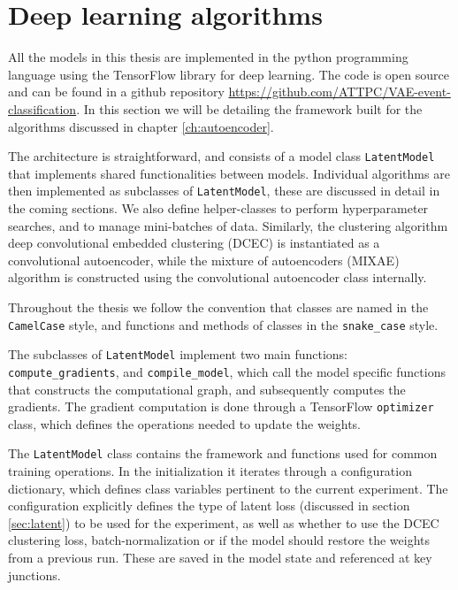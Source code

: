 \section{Deep learning algorithms}

All the models in this thesis are implemented in the python programming language using the TensorFlow library for deep learning. The code is open source and can be found in a github repository \url{https://github.com/ATTPC/VAE-event-classification}. In this section we will be detailing the framework built for the algorithms discussed in chapter \ref{ch:autoencoder}.

The architecture is straightforward, and consists of a model class \lstinline{LatentModel} that implements shared functionalities between models. Individual algorithms are then implemented as subclasses of \lstinline{LatentModel}, these are discussed in detail in the coming sections. We also define helper-classes to perform hyperparameter searches, and to manage mini-batches of data. Similarly, the clustering algorithm deep convolutional embedded clustering (DCEC) is instantiated as a convolutional autoencoder, while the mixture of autoencoders (MIXAE) algorithm is constructed using the convolutional autoencoder class internally. 

Throughout the thesis we follow the convention that classes are named in the \lstinline{CamelCase} style, and functions and methods of classes in the \lstinline{snake_case} style. 

The subclasses of \lstinline{LatentModel} implement two main functions: \lstinline{compute_gradients}, and \lstinline{compile_model}, which call the model specific functions that constructs the computational graph, and subsequently computes the gradients. The gradient computation is done through a TensorFlow \lstinline{optimizer} class, which defines the operations needed to update the weights. 

The \lstinline{LatentModel} class contains the framework and functions used for common training operations. In the initialization it iterates through a configuration dictionary, which defines class variables pertinent to the current experiment. The configuration explicitly defines the type of latent loss (discussed in section \ref{sec:latent}) to be used for the experiment, as well as whether to use the DCEC clustering loss, batch-normalization or if the model should restore the weights from a previous run. These are saved in the model state and referenced at key junctions.

